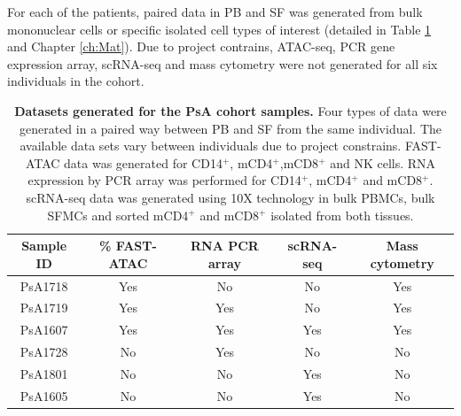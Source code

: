 
For each of the patients, paired data in PB and SF was generated from bulk mononuclear cells or specific isolated cell types of interest (detailed in Table \ref{tab:PSA_datasets_per_sample} and Chapter \ref{ch:Mat}). Due to project contrains, ATAC-seq, PCR gene expression array, scRNA-seq and mass cytometry were not generated for all six individuals in the cohort. 

\begin{table}[htbp]
\centering
\begin{tabular}{@{} c c c c c}
\toprule
\textbf{Sample ID} & \textbf{\% FAST-ATAC} & \textbf{RNA PCR array} & \textbf{scRNA-seq} & \textbf{Mass cytometry} \\
\midrule
\midrule
PsA1718 & Yes & No & No & Yes\\
PsA1719 & Yes & Yes & No & Yes\\
PsA1607 & Yes & Yes & Yes & Yes\\
PsA1728 & No & Yes & No & No\\
PsA1801 & No & No & Yes & No\\
PsA1605 & No & No & Yes & No\\
\bottomrule
\end{tabular}
\medskip %
\caption[Datasets generated for the PsA cohort samples.]{\textbf{Datasets generated for the PsA cohort samples.} Four types of data were generated in a paired way between PB and SF from the same individual. The available data sets vary between individuals due to project constrains. FAST-ATAC data was generated for CD14$^+$, mCD4$^+$,mCD8$^+$ and NK cells. RNA expression by PCR array was performed for CD14$^+$, mCD4$^+$ and mCD8$^+$. scRNA-seq data was generated using 10X technology in bulk PBMCs, bulk SFMCs and sorted mCD4$^+$ and mCD8$^+$ isolated from both tissues.}
\label{tab:PSA_datasets_per_sample}
\end{table}
\bigskip %

